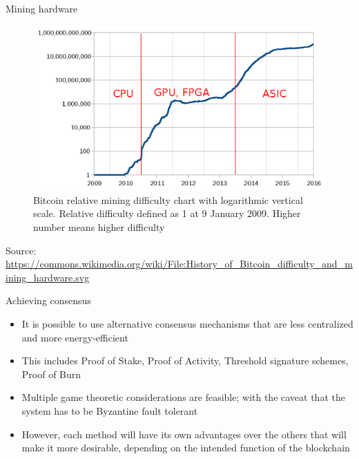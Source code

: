 \documentclass[10pt]{beamer}
\begin{document}
\begin{frame}{Mining hardware}
	\begin{figure}[]
		\centering
		\includegraphics  [scale=0.2]{Images/hardware}
		\caption{Bitcoin relative mining difficulty chart with logarithmic vertical scale. Relative difficulty defined as 1 at 9 January 2009. Higher number means higher difficulty}
	\end{figure}
	\begin{tiny}
		Source: \href{https://commons.wikimedia.org/wiki/File:History_of_Bitcoin_difficulty_and_mining_hardware.svg}{https://commons.wikimedia.org/wiki/File:History\_of\_Bitcoin\_difficulty\_and\_mining\_hardware.svg}
	\end{tiny}
\end{frame}


\begin{frame}{Achieving consensus}
	\begin{itemize}
		\item It is possible to use alternative consensus mechanisms that are less centralized and more energy-efficient
		\item This includes Proof of Stake, Proof of Activity, Threshold signature schemes, Proof of Burn
		\item Multiple game theoretic considerations are feasible; with the caveat that the system has to be Byzantine fault tolerant
		\item However, each method will have its own advantages over the others that will make it more desirable, depending on the intended function of the blockchain
	\end{itemize}
\end{frame}
\end{document}
